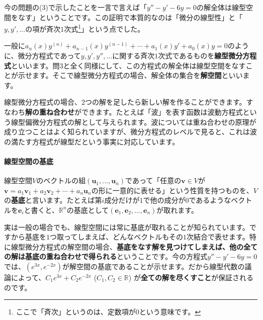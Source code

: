 今の問題の(3)で示したことを一言で言えば「$y'' - y' - 6y = 0$の解全体は線型空間をなす」ということです。この証明で本質的なのは「微分の線型性」と「$y,y',\ldots$の項が斉次$1$次式\footnote{ここで「斉次」というのは、定数項が$0$という意味です。}」という点でした。

一般に$a_n(x) y^{(n)} + a_{n - 1}(x) y^{(n-1)} + \cdots + a_1(x) y' + a_0(x) y = 0$のように、微分方程式であって$y, y', y'',\ldots$に関する斉次$1$次式であるものを\textbf{線型微分方程式}といいます。問3と全く同様にして、この方程式の解全体は線型空間をなすことが示せます。そこで線型微分方程式の場合、解全体の集合を\textbf{解空間}といいます。

線型微分方程式の場合、$2$つの解を足したら新しい解を作ることができます。すなわち\textbf{解の重ね合わせ}ができます。たとえば「波」を表す函数は波動方程式という線型偏微分方程式の解として与えられます。波については重ね合わせの原理が成り立つことはよく知られていますが、微分方程式のレベルで見ると、これは波の満たす方程式が線型だという事実に対応しています。

\paragraph{線型空間の基底}

線型空間$V$のベクトルの組$(\bm{u}_1, \ldots, \bm{u}_n)$であって「任意の$\bm{v}\in V$が$\bm{v} = a_1 \bm{v}_1 + a_2 \bm{v}_2 + \cdots + a_n \bm{u}_n$の形に一意的に表せる」という性質を持つものを、$V$の\textbf{基底}と言います。たとえば第$i$成分だけが$1$で他の成分が$0$であるようなベクトルを$\bm{e}_i$と書くと、$\mathbb{R}^n$の基底として$(\bm{e}_1, \bm{e}_2, \ldots, \bm{e}_n)$が取れます。

実は一般の場合でも、線型空間には常に基底が取れることが知られています。ですから基底を$1$つ取ってしまえば、どんなベクトルもその$1$次結合で表せます。特に線型微分方程式の解空間の場合、\textbf{基底をなす解を見つけてしまえば、他の全ての解は基底の重ね合わせで得られる}ということです。今の方程式$y'' - y' - 6y = 0$では、$(e^{3x}, e^{-2x})$が解空間の基底であることが示せます。だから線型代数の議論によって、$C_1 e^{3x} + C_2 e^{-2x}$ ($C_1, C_2\in\mathbb{R}$) が\textbf{全ての解を尽くすこと}が保証されるのです。

